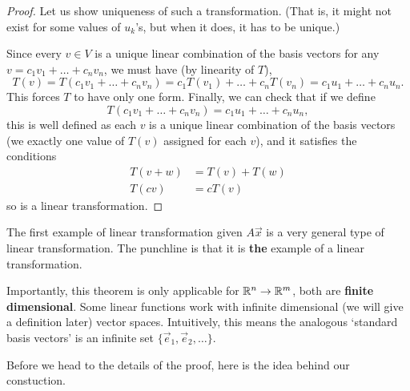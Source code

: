 \begin{proof}
	Let us show uniqueness of such a transformation. (That is, it might not exist for some values of $u_k$'s, but when it does, it has to be unique.) 

	Since every $v\in V$ is a unique linear combination of the basis vectors for any $v=c_1v_1+\ldots+c_nv_n$, we must have (by linearity of $T$), \[
	T(v) = T(c_1v_1+\ldots+c_nv_n)=c_1T(v_1)+\ldots+c_nT(v_n)=
	c_1u_1+\ldots+c_nu_n.
	\]
	This forces $T$ to have only one form. Finally, we can check that if we define 
	\[
	T(c_1v_1+\ldots+c_nv_n)=
	c_1u_1+\ldots+c_nu_n,
	\]
	this is well defined as each $v$ is a unique linear combination of the basis vectors (we exactly one value of $T(v)$ assigned for each $v$), and it satisfies the conditions \begin{align*}
		T(v+w)&=T(v)+T(w) \\
		T(cv)&=cT(v)
	\end{align*}
	so is a linear transformation.
\end{proof}
The first example of linear transformation given $A\vec{x}$ is a very general type of linear transformation.
The punchline is that it is \textbf{the} example of a linear transformation.
\begin{remark}
	Importantly, this theorem is only applicable for $\mathbb{R}^n\to\mathbb{R}^m$, both are \textbf{finite dimensional}.
	Some linear functions work with infinite dimensional (we will give a definition later) vector spaces. Intuitively, this means the analogous
	`standard basis vectors' is an infinite set $\{\vec{e}_1,\vec{e}_2,\ldots\}$. 
\end{remark}
Before we head to the details of the proof, here is the idea behind our constuction.
